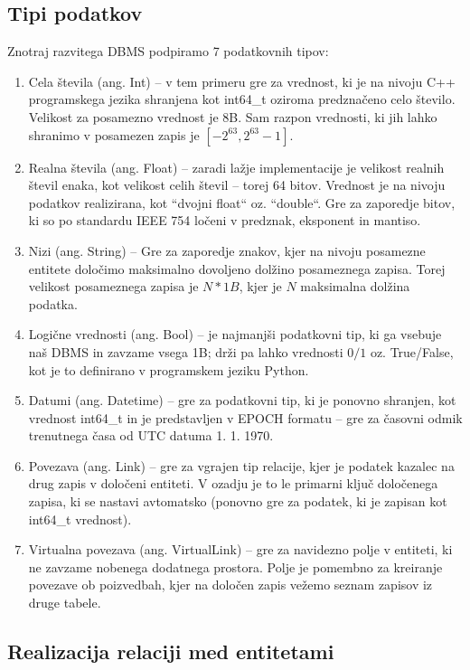 \documentclass[a4paper,12pt,openright]{book}
\begin{document}
        \subsection{Tipi podatkov}
        Znotraj razvitega DBMS podpiramo 7 podatkovnih tipov:
        \begin{enumerate}
            \item Cela števila (ang. Int) – v tem primeru gre za vrednost, ki je na nivoju C++ programskega jezika shranjena kot int64\_t oziroma predznačeno celo število. Velikost za posamezno vrednost je 8B. Sam razpon vrednosti, ki jih lahko shranimo v posamezen zapis je $[-2^{63}, 2^{63} - 1]$.
            \item Realna števila (ang. Float) – zaradi lažje implementacije je velikost realnih števil enaka, kot velikost celih števil – torej 64 bitov. Vrednost je na nivoju podatkov realizirana, kot ``dvojni float`` oz. ``double``. Gre za zaporedje bitov, ki so po standardu IEEE 754 \cite{kahan1996ieee} ločeni v predznak, eksponent in mantiso.
            \item Nizi (ang. String) – Gre za zaporedje znakov, kjer na nivoju posamezne entitete določimo maksimalno dovoljeno dolžino posameznega zapisa. Torej velikost posameznega zapisa je $N * 1B$, kjer je $N$ maksimalna dolžina podatka. 
            \item Logične vrednosti (ang. Bool) – je najmanjši podatkovni tip, ki ga vsebuje naš DBMS in zavzame vsega 1B; drži pa lahko vrednosti $0/1$ oz. True/False, kot je to definirano v programskem jeziku Python.
            \item Datumi (ang. Datetime) – gre za podatkovni tip, ki je ponovno shranjen, kot vrednost int64\_t in je predstavljen v EPOCH formatu \cite{EPOCH_FORMAT} – gre za časovni odmik trenutnega časa od UTC datuma 1. 1. 1970. 
            \item Povezava (ang. Link) – gre za vgrajen tip relacije, kjer je podatek kazalec na drug zapis v določeni entiteti. V ozadju je to le primarni ključ določenega zapisa, ki se nastavi avtomatsko (ponovno gre za podatek, ki je zapisan kot int64\_t vrednost).
            \item Virtualna povezava (ang. VirtualLink) – gre za navidezno polje v entiteti, ki ne zavzame nobenega dodatnega prostora. Polje je pomembno za kreiranje povezave ob poizvedbah, kjer na določen zapis vežemo seznam zapisov iz druge tabele.  
        \end{enumerate}
        
        \subsection{Realizacija relaciji med entitetami}
\end{document}
